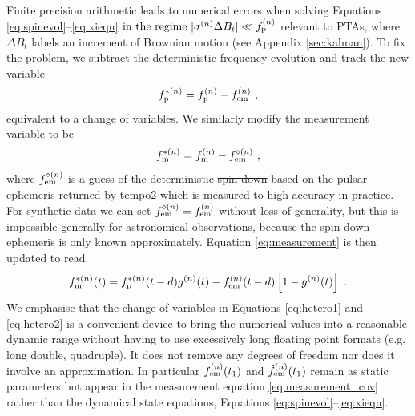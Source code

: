 \documentclass[fleqn,usenatbib,useAMS]{mnras}
\providecommand{\DIFadd}[1]{{\protect\color{blue}\uwave{#1}}} %
\providecommand{\DIFdel}[1]{{\protect\color{red}\sout{#1}}}                      %
\providecommand{\DIFaddbegin}{} %
\providecommand{\DIFaddend}{} %
\providecommand{\DIFdelbegin}{} %
\providecommand{\DIFdelend}{} %
\newcommand{\DIFscaledelfig}{0.5}
\newlength{\DIFdelgraphicswidth} %
\newlength{\DIFdelgraphicsheight} %
\newcommand{\DIFaddincludegraphics}[2][]{{\color{blue}\fbox{\DIFOincludegraphics[#1]{#2}}}} %
\newcommand{\DIFdelincludegraphics}[2][]{%
\sbox{\DIFdelgraphicsbox}{\DIFOincludegraphics[#1]{#2}}%
\settoboxwidth{\DIFdelgraphicswidth}{\DIFdelgraphicsbox} %
\settoboxtotalheight{\DIFdelgraphicsheight}{\DIFdelgraphicsbox} %
\scalebox{\DIFscaledelfig}{%
\parbox[b]{\DIFdelgraphicswidth}{\usebox{\DIFdelgraphicsbox}\\[-\baselineskip] \rule{\DIFdelgraphicswidth}{0em}}\llap{\resizebox{\DIFdelgraphicswidth}{\DIFdelgraphicsheight}{%
\setlength{\unitlength}{\DIFdelgraphicswidth}%
\begin{picture}(1,1)%
\thicklines\linethickness{2pt} %
{\color[rgb]{1,0,0}\put(0,0){\framebox(1,1){}}}%
{\color[rgb]{1,0,0}\put(0,0){\line( 1,1){1}}}%
{\color[rgb]{1,0,0}\put(0,1){\line(1,-1){1}}}%
\end{picture}%
}\hspace*{3pt}}} %
} %
\DeclareRobustCommand{\DIFaddbegin}{\DIFOaddbegin \let\includegraphics\DIFaddincludegraphics} %
\DeclareRobustCommand{\DIFaddend}{\DIFOaddend \let\includegraphics\DIFOincludegraphics} %
\DeclareRobustCommand{\DIFdelbegin}{\DIFOdelbegin \let\includegraphics\DIFdelincludegraphics} %
\DeclareRobustCommand{\DIFdelend}{\DIFOaddend \let\includegraphics\DIFOincludegraphics} %
\begin{document}
Finite precision arithmetic leads to numerical errors when solving Equations \eqref{eq:spinevol}--\eqref{eq:xieqn} \DIFdelbegin \DIFdel{$ \text{in  the regime } |\sigma^{(n)} \Delta B_t | \ll f_{\rm p}^{(n)}$ }\DIFdelend \DIFaddbegin \DIFadd{$ \text{in  the regime } |\sigma^{(n)} dB(t) | \ll f_{\rm p}^{(n)}$ }\DIFaddend relevant to PTAs, where $\Delta B_t$ labels an increment of Brownian motion (see Appendix \ref{sec:kalman}). To fix the problem, we subtract the deterministic frequency evolution and track the new variable
\begin{equation}
	f_{\rm p}^{* (n)} = f_{\rm p}^{(n)} - f_{\rm em}^{(n)} \ , \label{eq:hetero1}
\end{equation}  
equivalent to a change of variables. We similarly modify the measurement variable to be
\begin{equation}
	f_{\rm m}^{* (n)} = f_{\rm m}^{(n)} - f_{\rm em}^{\diamond (n)} \ , \label{eq:hetero2}
\end{equation}
where $ f_{\rm em}^{\diamond (n)}$ is a guess of the deterministic \DIFdelbegin \DIFdel{spin-down }\DIFdelend \DIFaddbegin \DIFadd{evolution }\DIFaddend based on the pulsar ephemeris returned by {\sc tempo2}  which is measured to high accuracy in practice. For synthetic data we can set $ f_{\rm em}^{\diamond (n)} = f_{\rm em}^{(n)}$ without loss of generality, but this is impossible generally for astronomical observations, because the spin-down ephemeris is only known approximately. Equation \eqref{eq:measurement} is then updated to read 
\begin{equation}
	f_{\rm m}^{* (n)}(t) = f_{\rm p}^{* (n)}(t-d) g^{(n)}(t) -  f_{\rm em}^{(n)}(t-d)\left[ 1-g^{(n)}(t)\right] \ .
	\label{eq:measurement_cov}
\end{equation}
We emphasise that the change of variables in Equations \eqref{eq:hetero1} and \eqref{eq:hetero2} is a convenient device to bring the numerical values into a reasonable dynamic range without having to use excessively long floating point formats (e.g. long double, quadruple). It does not remove any degrees of freedom nor does it involve an approximation. In particular $f_{\rm em}^{(n)}(t_1)$
and $\dot{f}_{\rm em}^{(n)}(t_1)$ remain as static parameters but appear in the measurement equation \eqref{eq:measurement_cov} rather than the dynamical state equations, \DIFaddbegin \DIFadd{i.e. }\DIFaddend Equations \eqref{eq:spinevol}--\eqref{eq:xieqn}.
\end{document}
